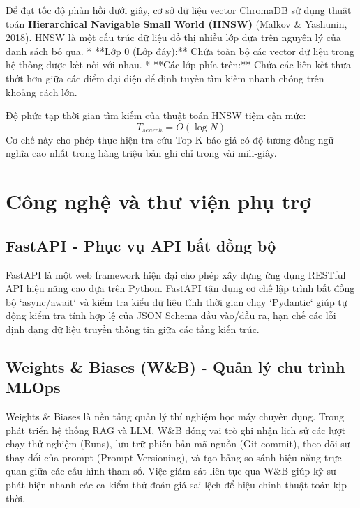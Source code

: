 Để đạt tốc độ phản hồi dưới giây, cơ sở dữ liệu vector ChromaDB sử dụng thuật toán \textbf{Hierarchical Navigable Small World (HNSW)} (Malkov \& Yashunin, 2018). HNSW là một cấu trúc dữ liệu đồ thị nhiều lớp dựa trên nguyên lý của danh sách bỏ qua.
*   **Lớp 0 (Lớp đáy):** Chứa toàn bộ các vector dữ liệu trong hệ thống được kết nối với nhau.
*   **Các lớp phía trên:** Chứa các liên kết thưa thớt hơn giữa các điểm đại diện để định tuyến tìm kiếm nhanh chóng trên khoảng cách lớn.

Độ phức tạp thời gian tìm kiếm của thuật toán HNSW tiệm cận mức:
\begin{equation}
    T_{search} = O(\log N)
\end{equation}
Cơ chế này cho phép thực hiện tra cứu Top-K báo giá có độ tương đồng ngữ nghĩa cao nhất trong hàng triệu bản ghi chỉ trong vài mili-giây.

\section{Công nghệ và thư viện phụ trợ}

\subsection{FastAPI - Phục vụ API bất đồng bộ}
FastAPI là một web framework hiện đại cho phép xây dựng ứng dụng RESTful API hiệu năng cao dựa trên Python. FastAPI tận dụng cơ chế lập trình bất đồng bộ `async/await` và kiểm tra kiểu dữ liệu tĩnh thời gian chạy `Pydantic` giúp tự động kiểm tra tính hợp lệ của JSON Schema đầu vào/đầu ra, hạn chế các lỗi định dạng dữ liệu truyền thông tin giữa các tầng kiến trúc.

\subsection{Weights \& Biases (W\&B) - Quản lý chu trình MLOps}
Weights \& Biases là nền tảng quản lý thí nghiệm học máy chuyên dụng. Trong phát triển hệ thống RAG và LLM, W\&B đóng vai trò ghi nhận lịch sử các lượt chạy thử nghiệm (Runs), lưu trữ phiên bản mã nguồn (Git commit), theo dõi sự thay đổi của prompt (Prompt Versioning), và tạo bảng so sánh hiệu năng trực quan giữa các cấu hình tham số. Việc giám sát liên tục qua W\&B giúp kỹ sư phát hiện nhanh các ca kiểm thử đoán giá sai lệch để hiệu chỉnh thuật toán kịp thời.
